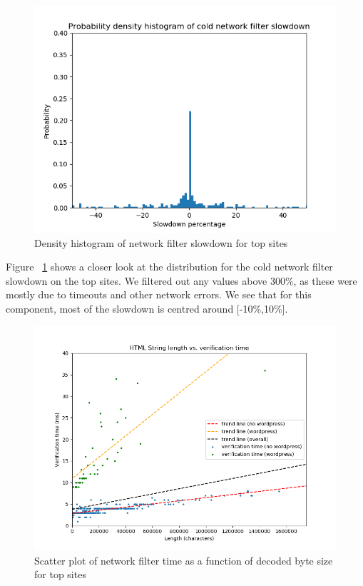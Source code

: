 \begin{figure}[h]
	\includegraphics[scale=0.5]{results/density_histogram_filter_slowdown}
	\caption{Density histogram of network filter slowdown for top sites}
	\label{fig:histogram_slowdown}
\end{figure}


Figure ~\ref{fig:histogram_slowdown} shows a closer look at the distribution for the cold network filter slowdown on the top sites. We filtered out any values above 300\%, as these were mostly due to timeouts and other network errors. We see that for this component, most of the slowdown is centred around [-10\%,10\%].

\begin{figure}[h]
	\includegraphics[scale=0.4]{results/string_length_vs_verification_time}
	\caption{Scatter plot of network filter time as a function of decoded byte size for top sites}
	\label{fig:verification_time_string_length}
\end{figure}

